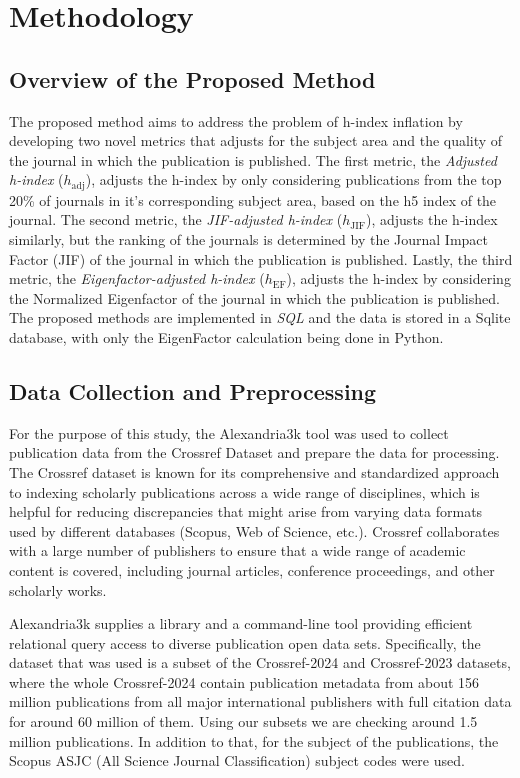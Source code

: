 \chapter{Methodology}
\label{ch:methods}

\section{Overview of the Proposed Method}

The proposed method aims to address the problem of h-index inflation by
developing two novel metrics that adjusts for the subject area and the quality
of the journal in which the publication is published. The first metric, the
\textit{Adjusted h-index} ($h_{\text{adj}}$), adjusts the h-index by only
considering publications from the top 20\% of journals in it's corresponding
subject area, based on the h5 index of the journal. The second metric, the
\textit{JIF-adjusted h-index} ($h_{\text{JIF}}$), adjusts the h-index
similarly, but the ranking of the journals is determined by the Journal Impact
Factor (JIF) of the journal in which the publication is published. Lastly, the
third metric, the \textit{Eigenfactor-adjusted h-index} ($h_{\text{EF}}$),
adjusts the h-index by considering the Normalized Eigenfactor of the journal in
which the publication is published. The proposed methods are implemented in
\emph{SQL} and the data is stored in a Sqlite database, with only the
EigenFactor calculation being done in Python.

\section{Data Collection and Preprocessing}

For the purpose of this study, the Alexandria3k \cite{Spi23g} tool was used to
collect publication data from the Crossref Dataset \cite{Crossref2020} and
prepare the data for processing. The Crossref dataset is known for its
comprehensive and standardized approach to indexing scholarly publications
across a wide range of disciplines, which is helpful for reducing discrepancies
that might arise from varying data formats used by different databases (Scopus,
Web of Science, etc.). Crossref collaborates with a large number of publishers
to ensure that a wide range of academic content is covered, including journal
articles, conference proceedings, and other scholarly works.

Alexandria3k supplies a library and a command-line tool providing efficient
relational query access to diverse publication open data sets. Specifically,
the dataset that was used is a subset of the Crossref-2024 and Crossref-2023
datasets, where the whole Crossref-2024 contain publication metadata from about
156 million publications from all major international publishers with full
citation data for around 60 million of them. Using our subsets we are checking
around 1.5 million publications. In addition to that, for the subject of the
publications, the Scopus ASJC (All Science Journal Classification) subject
codes were used.

